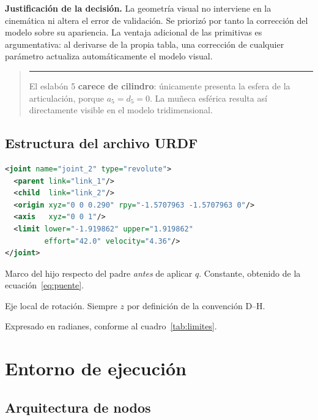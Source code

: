 \documentclass[11pt,a4paper]{article}
\newenvironment{nota}
  {\begin{quote}\small\color{oscuro}\rule{2pt}{\baselineskip}\hspace{6pt}\ignorespaces}
  {\end{quote}}
\begin{document}
\textbf{Justificación de la decisión.} La geometría visual no interviene
en la cinemática ni altera el error de validación. Se priorizó por tanto
la corrección del modelo sobre su apariencia. La ventaja adicional de
las primitivas es argumentativa: al derivarse de la propia tabla, una
corrección de cualquier parámetro actualiza automáticamente el modelo
visual.

\begin{nota}
El eslabón 5 \textbf{carece de cilindro}: únicamente presenta la esfera
de la articulación, porque $a_5 = d_5 = 0$. La muñeca esférica resulta
así directamente visible en el modelo tridimensional.
\end{nota}

\subsection{Estructura del archivo URDF}

\begin{lstlisting}[language=XML,caption={Fragmento representativo del
URDF generado}]
<joint name="joint_2" type="revolute">
  <parent link="link_1"/>
  <child  link="link_2"/>
  <origin xyz="0 0 0.290" rpy="-1.5707963 -1.5707963 0"/>
  <axis   xyz="0 0 1"/>
  <limit lower="-1.919862" upper="1.919862"
         effort="42.0" velocity="4.36"/>
</joint>
\end{lstlisting}

\begin{description}[leftmargin=*,style=nextline,font=\ttfamily\bfseries]
\item[origin] Marco del hijo respecto del padre \emph{antes} de aplicar
$q$. Constante, obtenido de la ecuación~\eqref{eq:puente}.
\item[axis] Eje local de rotación. Siempre $z$ por definición de la
convención D--H.
\item[limit] Expresado en radianes, conforme al cuadro~\ref{tab:limites}.
\end{description}

\section{Entorno de ejecución}

\subsection{Arquitectura de nodos}
\end{document}
